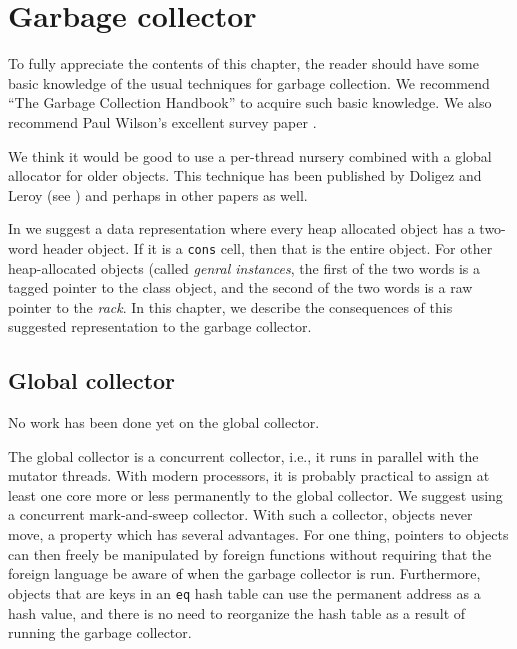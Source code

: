 \chapter{Garbage collector}

To fully appreciate the contents of this chapter, the reader should
have some basic knowledge of the usual techniques for garbage
collection.  We recommend ``The Garbage Collection Handbook''
\cite{Jones:2011:GCH:2025255} to acquire such basic knowledge.  We
also recommend Paul Wilson's excellent survey paper
\cite{Wilson:1992:UGC:645648.664824}.

We think it would be good to use a per-thread nursery combined with a
global allocator for older objects.  This technique has been published
by Doligez and Leroy (see \cite{Doligez:1993:CGG:158511.158611}) and
perhaps in other papers as well.

In  we suggest a data representation
where every heap allocated object has a two-word header object.  If it
is a \texttt{cons} cell, then that is the entire object.  For other
heap-allocated objects (called \emph{genral instances}, the first of
the two words is a tagged pointer to the class object, and the second
of the two words is a raw pointer to the \emph{rack}.  In
this chapter, we describe the consequences of this suggested
representation to the garbage collector.

\section{Global collector}
No work has been done yet on the global collector.  

The global collector is a concurrent collector, i.e., it runs in
parallel with the mutator threads.  With modern processors, it is
probably practical to assign at least one core more or less
permanently to the global collector.  We suggest using a concurrent
mark-and-sweep collector.  With such a collector, objects
never move, a property which has several advantages.  For one thing,
pointers to objects can then freely be manipulated by foreign
functions without requiring that the foreign language be aware of when
the garbage collector is run.  Furthermore, objects that are keys in
an \texttt{eq} hash table can use the permanent address as a hash
value, and there is no need to reorganize the hash table as a result
of running the garbage collector. 

